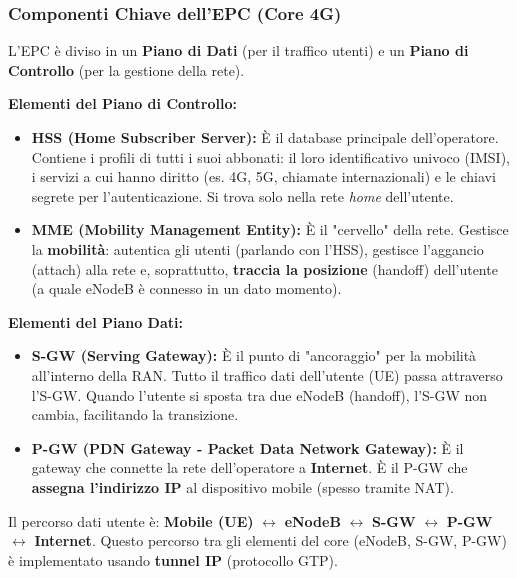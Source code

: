 \subsubsection{Componenti Chiave dell'EPC (Core 4G)}
L'EPC è diviso in un \textbf{Piano di Dati} (per il traffico utenti) e un \textbf{Piano di Controllo} (per la gestione della rete).

\textbf{Elementi del Piano di Controllo:}
\begin{itemize}
    \item \textbf{HSS (Home Subscriber Server):} È il database principale dell'operatore. Contiene i profili di tutti i suoi abbonati: il loro identificativo univoco (IMSI), i servizi a cui hanno diritto (es. 4G, 5G, chiamate internazionali) e le chiavi segrete per l'autenticazione. Si trova solo nella rete \textit{home} dell'utente.
    \item \textbf{MME (Mobility Management Entity):} È il "cervello" della rete. Gestisce la \textbf{mobilità}: autentica gli utenti (parlando con l'HSS), gestisce l'aggancio (attach) alla rete e, soprattutto, \textbf{traccia la posizione} (handoff) dell'utente (a quale eNodeB è connesso in un dato momento).
\end{itemize}

\textbf{Elementi del Piano Dati:}
\begin{itemize}
    \item \textbf{S-GW (Serving Gateway):} È il punto di "ancoraggio" per la mobilità all'interno della RAN. Tutto il traffico dati dell'utente (UE) passa attraverso l'S-GW. Quando l'utente si sposta tra due eNodeB (handoff), l'S-GW non cambia, facilitando la transizione.
    \item \textbf{P-GW (PDN Gateway - Packet Data Network Gateway):} È il gateway che connette la rete dell'operatore a \textbf{Internet}. È il P-GW che \textbf{assegna l'indirizzo IP} al dispositivo mobile (spesso tramite NAT).
\end{itemize}

Il percorso dati utente è: \textbf{Mobile (UE)} $\leftrightarrow$ \textbf{eNodeB} $\leftrightarrow$ \textbf{S-GW} $\leftrightarrow$ \textbf{P-GW} $\leftrightarrow$ \textbf{Internet}.
Questo percorso tra gli elementi del core (eNodeB, S-GW, P-GW) è implementato usando \textbf{tunnel IP} (protocollo GTP).

